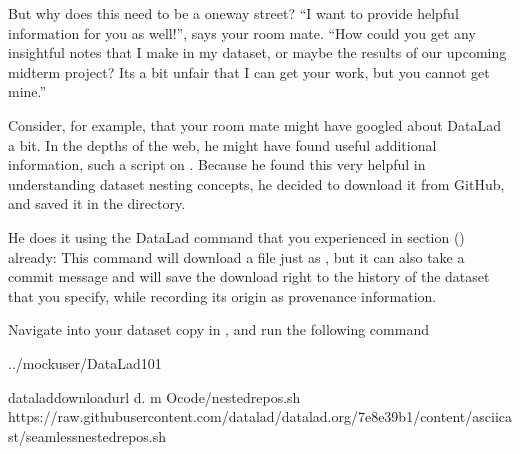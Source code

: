 \sphinxAtStartPar
But why does this need to be a one\sphinxhyphen{}way street? “I want to
provide helpful information for you as well!”, says your
room mate. “How could you get any insightful notes that
I make in my dataset, or maybe the results of our upcoming
mid\sphinxhyphen{}term project? Its a bit unfair that I can get your work,
but you cannot get mine.”

\ignorespaces 
\sphinxAtStartPar
Consider, for example, that your room mate might have googled about DataLad
a bit. In the depths of the web, he might have found useful additional information, such
a script on .
Because he found this very helpful in understanding dataset
nesting concepts, he decided to download it from GitHub, and saved it in the  directory.

\sphinxAtStartPar
He does it using the DataLad command 
that you experienced in section {\hyperref[\detokenize{basics/101-101-create:createds}]{}} () already: This command will
download a file just as , but it can also take a commit message
and will save the download right to the history of the dataset that you specify,
while recording its origin as provenance information.

\sphinxAtStartPar
Navigate into your dataset copy in ,
and run the following command

\begin{sphinxVerbatim}[commandchars=\\\{\}]
../mock\PYGZus{}user/DataLad\PYGZhy{}101

dataladdownload\PYGZhy{}url
\PYGZhy{}d.
\PYGZhy{}m
\PYGZhy{}Ocode/nested\PYGZus{}repos.sh
https://raw.githubusercontent.com/datalad/datalad.org/7e8e39b1/content/asciicast/seamless\PYGZus{}nested\PYGZus{}repos.sh
\end{sphinxVerbatim}

